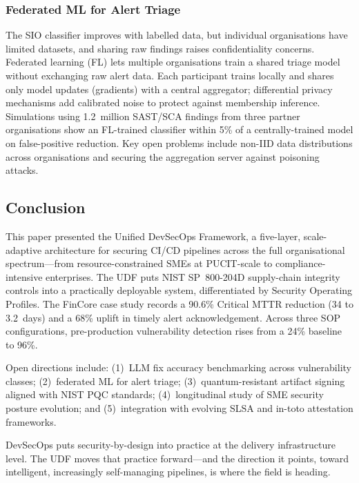 \documentclass[letterpaper, 10pt, conference]{ieeeconf}
\begin{document}
\subsubsection{Federated ML for Alert Triage}

The SIO classifier improves with labelled data, but individual
organisations have limited datasets, and sharing raw findings raises
confidentiality concerns. Federated learning (FL) lets multiple
organisations train a shared triage model without exchanging raw alert
data. Each participant trains locally and shares only model updates
(gradients) with a central aggregator; differential privacy mechanisms
add calibrated noise to protect against membership inference. Simulations
using 1.2~million SAST/SCA findings from three partner organisations
show an FL-trained classifier within 5\% of a centrally-trained model
on false-positive reduction. Key open problems include non-IID data
distributions across organisations and securing the aggregation server
against poisoning attacks.

\subsection{Conclusion}

This paper presented the Unified DevSecOps Framework, a five-layer,
scale-adaptive architecture for securing CI/CD pipelines across the full
organisational spectrum---from resource-constrained SMEs at PUCIT-scale
to compliance-intensive enterprises. The UDF puts NIST SP~800-204D
supply-chain integrity controls into a practically deployable system,
differentiated by Security Operating Profiles. The FinCore case study
records a 90.6\% Critical MTTR reduction (34 to 3.2~days) and a 68\%
uplift in timely alert acknowledgement. Across three SOP configurations,
pre-production vulnerability detection rises from a 24\% baseline to
96\%.

Open directions include: (1)~LLM fix accuracy benchmarking across
vulnerability classes; (2)~federated ML for alert triage;
(3)~quantum-resistant artifact signing aligned with NIST PQC standards;
(4)~longitudinal study of SME security posture evolution; and
(5)~integration with evolving SLSA and in-toto attestation frameworks.

DevSecOps puts security-by-design into practice at the delivery
infrastructure level. The UDF moves that practice forward---and the
direction it points, toward intelligent, increasingly self-managing
pipelines, is where the field is heading.
\end{document}

